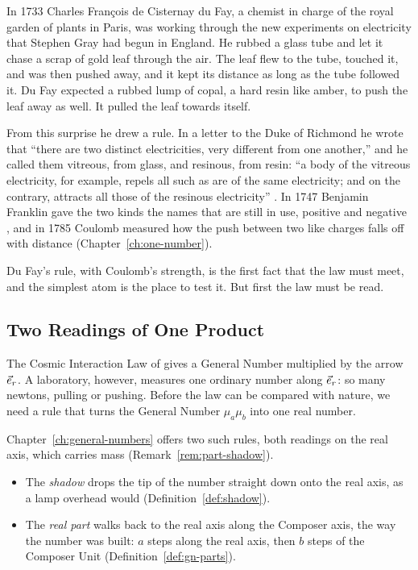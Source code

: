
In 1733 Charles Fran\c{c}ois de Cisternay du Fay, a chemist in charge of the royal garden of plants in Paris, was working through the new experiments on electricity that Stephen Gray had begun in England. He rubbed a glass tube and let it chase a scrap of gold leaf through the air. The leaf flew to the tube, touched it, and was then pushed away, and it kept its distance as long as the tube followed it. Du Fay expected a rubbed lump of copal, a hard resin like amber, to push the leaf away as well. It pulled the leaf towards itself.

From this surprise he drew a rule. In a letter to the Duke of Richmond he wrote that \enquote{there are two distinct electricities, very different from one another,} and he called them vitreous, from glass, and resinous, from resin: \enquote{a body of the vitreous electricity, for example, repels all such as are of the same electricity; and on the contrary, attracts all those of the resinous electricity} \citep{DuFay1733}. In 1747 Benjamin Franklin gave the two kinds the names that are still in use, positive and negative \citep{Franklin1751}, and in 1785 Coulomb measured how the push between two like charges falls off with distance (Chapter~\ref{ch:one-number}).

Du Fay's rule, with Coulomb's strength, is the first fact that the law must meet, and the simplest atom is the place to test it. But first the law must be read.

\subsection{Two Readings of One Product}\label{subsec:reading}

The Cosmic Interaction Law of  gives a General Number multiplied by the arrow $\vec{e}_r$. A laboratory, however, measures one ordinary number along $\vec{e}_r$: so many newtons, pulling or pushing. Before the law can be compared with nature, we need a rule that turns the General Number $\mu_a \mu_b$ into one real number.

Chapter~\ref{ch:general-numbers} offers two such rules, both readings on the real axis, which carries mass (Remark~\ref{rem:part-shadow}).
\begin{itemize}
  \item The \emph{shadow} drops the tip of the number straight down onto the real axis, as a lamp overhead would (Definition~\ref{def:shadow}).
  \item The \emph{real part} walks back to the real axis along the Composer axis, the way the number was built: $a$ steps along the real axis, then $b$ steps of the Composer Unit (Definition~\ref{def:gn-parts}).
\end{itemize}


